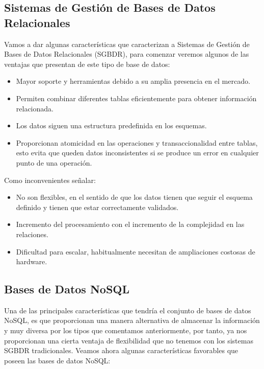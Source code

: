 \subsection{Sistemas de Gestión de Bases de Datos Relacionales}

Vamos a dar algunas características que caracterizan a Sistemas de Gestión de Bases de Datos Relacionales (SGBDR), para comenzar veremos algunos de las ventajas que presentan de este tipo de base de datos:

\begin{itemize}
    \item Mayor soporte y herramientas debido a su amplia presencia en el mercado.
    \item Permiten combinar diferentes tablas eficientemente para obtener información relacionada.
    \item Los datos siguen una estructura predefinida en los esquemas.
    \item Proporcionan atomicidad en las operaciones y transaccionalidad entre tablas, esto evita que queden datos inconsistentes si se produce un error en cualquier punto de una operación.
\end{itemize}

Como inconvenientes señalar:

\begin{itemize}
    \item No son flexibles, en el sentido de que los datos tienen que seguir el esquema definido y tienen que estar correctamente validados.
    \item Incremento del procesamiento con el incremento de la complejidad en las relaciones.
    \item Dificultad para escalar, habitualmente necesitan de ampliaciones costosas de hardware.
\end{itemize}

\subsection{Bases de Datos NoSQL}

Una de las principales características que tendría el conjunto de bases de datos NoSQL, es que proporcionan una manera alternativa de almacenar la información y muy diversa por los tipos que comentamos anteriormente, por tanto, ya nos proporcionan una cierta ventaja de flexibilidad que no tenemos con los sistemas SGBDR tradicionales. Veamos ahora algunas características favorables que poseen las bases de datos NoSQL:

